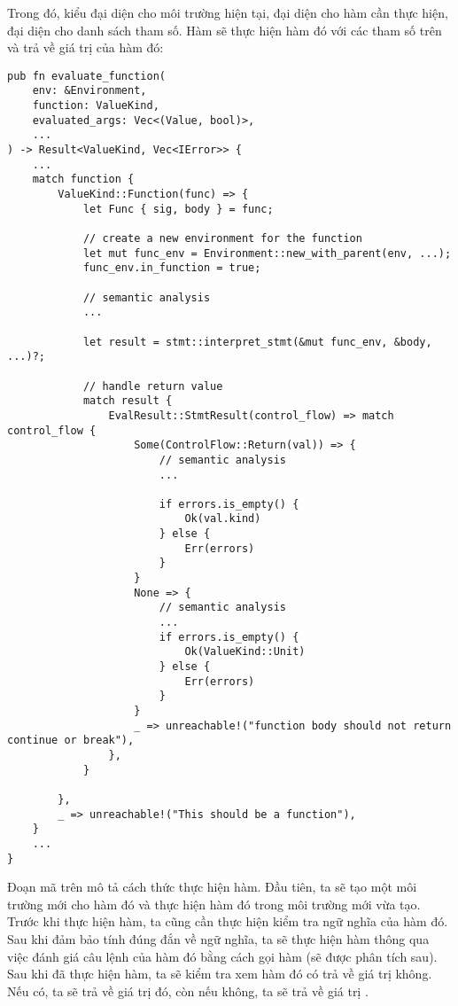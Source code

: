     Trong đó,  kiểu  đại diện cho môi trường hiện tại,  đại diện cho hàm cần thực hiện,  đại diện cho danh sách tham số. Hàm  sẽ thực hiện hàm đó với các tham số trên và trả về giá trị của hàm đó:

\begin{lstlisting}[]
pub fn evaluate_function(
    env: &Environment,
    function: ValueKind,
    evaluated_args: Vec<(Value, bool)>,
    ...
) -> Result<ValueKind, Vec<IError>> {
    ...
    match function {
        ValueKind::Function(func) => {
            let Func { sig, body } = func;

            // create a new environment for the function
            let mut func_env = Environment::new_with_parent(env, ...);
            func_env.in_function = true;

            // semantic analysis
            ...

            let result = stmt::interpret_stmt(&mut func_env, &body, ...)?;

            // handle return value
            match result {
                EvalResult::StmtResult(control_flow) => match control_flow {
                    Some(ControlFlow::Return(val)) => {
                        // semantic analysis
                        ...
                        
                        if errors.is_empty() {
                            Ok(val.kind)
                        } else {
                            Err(errors)
                        }
                    }
                    None => {
                        // semantic analysis
                        ...
                        if errors.is_empty() {
                            Ok(ValueKind::Unit)
                        } else {
                            Err(errors)
                        }
                    }
                    _ => unreachable!("function body should not return continue or break"),
                },
            }

        },
        _ => unreachable!("This should be a function"),
    }
    ...
}
\end{lstlisting}

    Đoạn mã trên mô tả cách thức thực hiện hàm. Đầu tiên, ta sẽ tạo một môi trường mới cho hàm đó và thực hiện hàm đó trong môi trường mới vừa tạo. Trước khi thực hiện hàm, ta cũng cần thực hiện kiểm tra ngữ nghĩa của hàm đó. Sau khi đảm bảo tính đúng đắn về ngữ nghĩa, ta sẽ thực hiện hàm thông qua việc đánh giá câu lệnh của hàm đó bằng cách gọi hàm  (sẽ được phân tích sau). Sau khi đã thực hiện hàm, ta sẽ kiểm tra xem hàm đó có trả về giá trị không. Nếu có, ta sẽ trả về giá trị đó, còn nếu không, ta sẽ trả về giá trị . 

